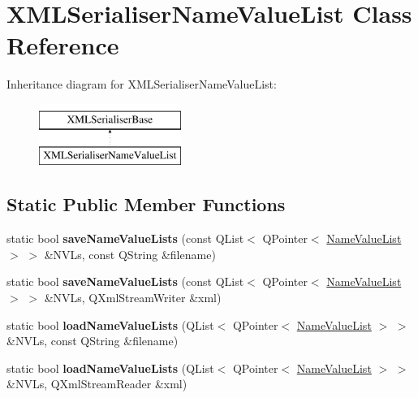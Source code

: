 \hypertarget{class_x_m_l_serialiser_name_value_list}{}\section{X\+M\+L\+Serialiser\+Name\+Value\+List Class Reference}
\label{class_x_m_l_serialiser_name_value_list}
Inheritance diagram for X\+M\+L\+Serialiser\+Name\+Value\+List\+:\begin{figure}[H]
\begin{center}
\leavevmode
\includegraphics[height=2.000000cm]{class_x_m_l_serialiser_name_value_list}
\end{center}
\end{figure}
\subsection*{Static Public Member Functions}
\begin{DoxyCompactItemize}
\item 
\mbox{\label{class_x_m_l_serialiser_name_value_list_a5760831df243b69615b49a10e5ad230d}} 
static bool {\bfseries save\+Name\+Value\+Lists} (const Q\+List$<$ Q\+Pointer$<$ \hyperlink{class_name_value_list}{Name\+Value\+List} $>$ $>$ \&N\+V\+Ls, const Q\+String \&filename)
\item 
\mbox{\label{class_x_m_l_serialiser_name_value_list_a964d7a2c619782f2f841c88aaa62ad2d}} 
static bool {\bfseries save\+Name\+Value\+Lists} (const Q\+List$<$ Q\+Pointer$<$ \hyperlink{class_name_value_list}{Name\+Value\+List} $>$ $>$ \&N\+V\+Ls, Q\+Xml\+Stream\+Writer \&xml)
\item 
\mbox{\label{class_x_m_l_serialiser_name_value_list_a9997ed8dfe7baf2636a1f0b12ae508f7}} 
static bool {\bfseries load\+Name\+Value\+Lists} (Q\+List$<$ Q\+Pointer$<$ \hyperlink{class_name_value_list}{Name\+Value\+List} $>$ $>$ \&N\+V\+Ls, const Q\+String \&filename)
\item 
\mbox{\label{class_x_m_l_serialiser_name_value_list_aa13ae5c92c4bcd43c52d868bbe3c723a}} 
static bool {\bfseries load\+Name\+Value\+Lists} (Q\+List$<$ Q\+Pointer$<$ \hyperlink{class_name_value_list}{Name\+Value\+List} $>$ $>$ \&N\+V\+Ls, Q\+Xml\+Stream\+Reader \&xml)
\end{DoxyCompactItemize}


